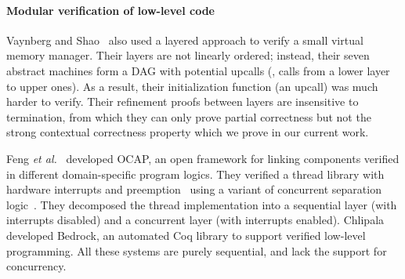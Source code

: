 \paragraph{Modular verification of low-level code} 
Vaynberg and Shao~\cite{vaynberg12} also used a layered approach to
verify a small virtual memory manager. Their layers are not linearly
ordered; instead, their seven abstract machines form a DAG with
potential upcalls (\ie, calls from a lower layer to upper ones). As a
result, their initialization function (an upcall) was much harder to
verify. Their refinement proofs between layers are insensitive to
termination, from which they can only prove partial correctness but
not the strong contextual correctness property which we prove in our
current work.

Feng {\em et al.}~\cite{feng08:vstte} developed OCAP, an open
framework for linking components verified in different
domain-specific program logics. They verified a
thread library with hardware interrupts and
preemption~\cite{feng08:aim} using a variant of concurrent
separation logic~\cite{ohearn:concur04}. They decomposed the thread
implementation into a sequential layer (with interrupts disabled)
and a concurrent layer (with interrupts enabled).
Chlipala~\cite{BedrockPLDI11} developed Bedrock, an automated
Coq library to support verified low-level programming. All these
systems
are purely sequential, 
and lack the support for concurrency.

